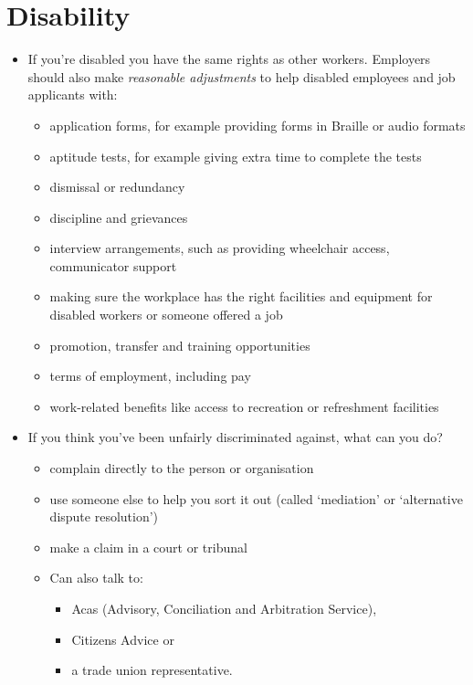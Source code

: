 \documentclass{article}
\begin{document}
\section{Disability}

\begin{itemize}
\item If you're disabled you have the same rights as other workers. Employers should also make {\em reasonable adjustments} to help disabled employees and job applicants with:

\begin{itemize}
\item application forms, for example providing forms in Braille or audio formats
\item aptitude tests, for example giving extra time to complete the tests
\item dismissal or redundancy
\item discipline and grievances
\item interview arrangements, such as providing wheelchair access, communicator support
\item making sure the workplace has the right facilities and equipment for disabled workers or someone offered a job
\item promotion, transfer and training opportunities
\item terms of employment, including pay
\item work-related benefits like access to recreation or refreshment facilities
\end{itemize}
\end{itemize}





\begin{itemize}
\item If you think you've been unfairly discriminated against, what can you do?
 

\begin{itemize}
\item complain directly to the person or organisation
\item use someone else to help you sort it out (called `mediation' or `alternative dispute resolution')
\item make a claim in a court or tribunal
\item Can also talk to:
\begin{itemize}
\item Acas (Advisory, Conciliation and Arbitration Service),
\item Citizens Advice or
\item a trade union representative.
\end{itemize}
\end{itemize}
\end{itemize}
\end{document}
